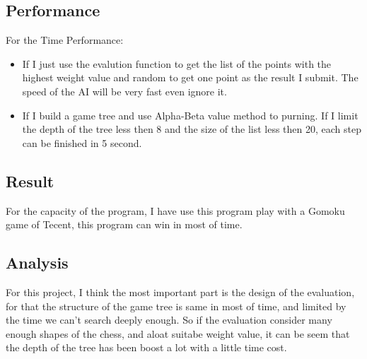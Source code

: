 \documentclass[conference,compsoc]{IEEEtran}
\begin{document}
\subsection{Performance}
For the Time Performance:
\begin{itemize}
  \item If I just use the evalution function to get the list of the points with the highest weight value and random to get one point as the result I submit. The speed of the AI will be very fast even ignore it.
  \item If I  build a game tree and use Alpha-Beta value method to purning. If I limit the depth of the tree less then 8 and the size of the list less then 20, each step can be finished in 5 second.
\end{itemize}

\subsection{Result}
For the capacity of the program, I have use this program play with a Gomoku game of Tecent, this program can win in most of time.
\subsection{Analysis}
For this project, I think the most important part is the design of the evaluation, for that the structure of the game tree is same in most of time, and limited by the time we can't search deeply enough. 
So if the evaluation consider many enough shapes of the chess, and aloat suitabe weight value, it can be seem that the depth of the tree has been boost a lot with a little time cost.











%
%
\begin{thebibliography}{1}

\end{thebibliography}





\end{document}
